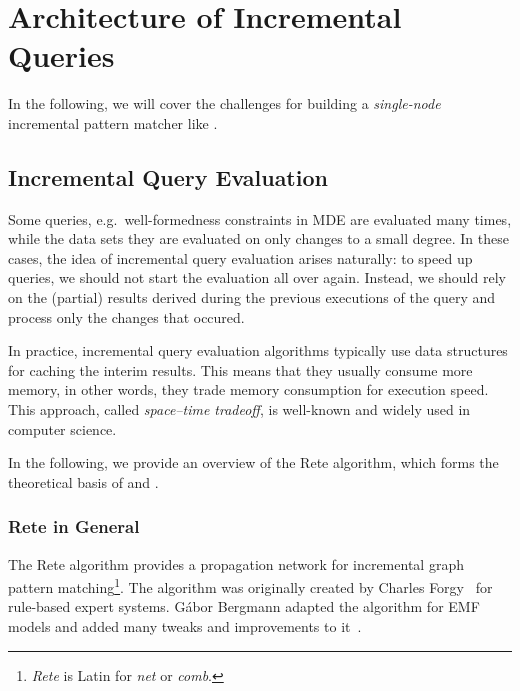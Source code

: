 \section{Architecture of Incremental Queries}
\label{sec:architecture}

In the following, we will cover the challenges for building a \emph{single-node} incremental pattern matcher like \eiq{}.


\subsection{Incremental Query Evaluation}
\label{rete}

Some queries, e.g.\ well-formedness constraints in MDE are evaluated many times, while the data sets they are evaluated on only changes to a small degree. In these cases, the idea of incremental query evaluation arises naturally: to speed up queries, we should not start the evaluation all over again. Instead, we should rely on the (partial) results derived during the previous executions of the query and process only the changes that occured.
 
In practice, incremental query evaluation algorithms typically use data structures for caching the interim results. This  means that they usually consume more memory, in other words, they trade memory consumption for execution speed. This approach, called \emph{space--time tradeoff}, is well-known and widely used in computer science.

In the following, we provide an overview of the Rete algorithm, which forms the theoretical basis of \eiq{} and \iqd{}.

\subsubsection{Rete in General}

The Rete algorithm provides a propagation network for incremental graph pattern matching\footnote{\emph{Rete} is Latin for \emph{net} or \emph{comb}.}. The algorithm was originally created by Charles Forgy~\cite{Forgy} for rule-based expert systems. Gábor Bergmann adapted the algorithm for EMF models and added many tweaks and improvements to it~\cite{BergmannRete}.


